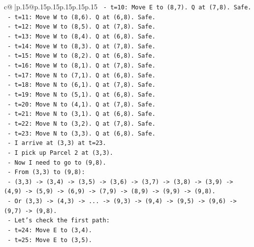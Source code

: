 \documentclass{article}
\begin{document}
{\begin{supertabular}{c@{$\;$}|p{.15\linewidth}@{}p{.15\linewidth}p{.15\linewidth}p{.15\linewidth}p{.15\linewidth}p{.15\linewidth}}
{{{\texttt{            {-}   t=10: Move E to (8,7). Q at (7,8). Safe.} \\
\texttt{            {-}   t=11: Move W to (8,6). Q at (6,8). Safe.} \\
\texttt{            {-}   t=12: Move W to (8,5). Q at (7,8). Safe.} \\
\texttt{            {-}   t=13: Move W to (8,4). Q at (6,8). Safe.} \\
\texttt{            {-}   t=14: Move W to (8,3). Q at (7,8). Safe.} \\
\texttt{            {-}   t=15: Move W to (8,2). Q at (6,8). Safe.} \\
\texttt{            {-}   t=16: Move W to (8,1). Q at (7,8). Safe.} \\
\texttt{            {-}   t=17: Move N to (7,1). Q at (6,8). Safe.} \\
\texttt{            {-}   t=18: Move N to (6,1). Q at (7,8). Safe.} \\
\texttt{            {-}   t=19: Move N to (5,1). Q at (6,8). Safe.} \\
\texttt{            {-}   t=20: Move N to (4,1). Q at (7,8). Safe.} \\
\texttt{            {-}   t=21: Move N to (3,1). Q at (6,8). Safe.} \\
\texttt{            {-}   t=22: Move N to (3,2). Q at (7,8). Safe.} \\
\texttt{            {-}   t=23: Move N to (3,3). Q at (6,8). Safe.} \\
\texttt{            {-}   I arrive at (3,3) at t=23.} \\
\texttt{            {-}   I pick up Parcel 2 at (3,3).} \\
\texttt{            {-}   Now I need to go to (9,8).} \\
\texttt{            {-}   From (3,3) to (9,8):} \\
\texttt{                {-}   (3,3) {-}> (3,4) {-}> (3,5) {-}> (3,6) {-}> (3,7) {-}> (3,8) {-}> (3,9) {-}> (4,9) {-}> (5,9) {-}> (6,9) {-}> (7,9) {-}> (8,9) {-}> (9,9) {-}> (9,8).} \\
\texttt{                {-}   Or (3,3) {-}> (4,3) {-}> ... {-}> (9,3) {-}> (9,4) {-}> (9,5) {-}> (9,6) {-}> (9,7) {-}> (9,8).} \\
\texttt{            {-}   Let's check the first path:} \\
\texttt{                {-}   t=24: Move E to (3,4).} \\
\texttt{                {-}   t=25: Move E to (3,5).} \\
}}}
\end{supertabular}}
\end{document}
